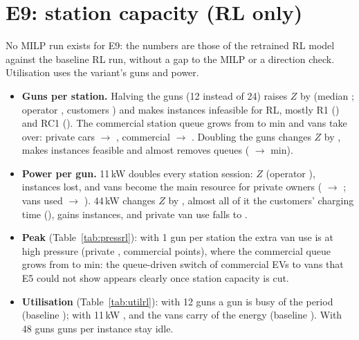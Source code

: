 \section{E9: station capacity (RL only)}\label{sec:e9}
No MILP run exists for E9: the numbers are those of the retrained RL model against the baseline RL run, without a gap to the MILP or a direction check. Utilisation uses the variant's guns and power.


\begin{itemize}
  \item \textbf{Guns per station.} Halving the guns (12 instead of 24) raises $Z$ by \dZEnineGunsLoRt\pct{} (median \dZmedEnineGunsLoRt\pct; operator \dOpEnineGunsLoRt\pct, customers \dCuEnineGunsLoRt\pct) and makes \LostEnineGunsLoRt{} instances infeasible for RL, mostly R1 (\LostFamEnineGunsLoRone) and RC1 (\LostFamEnineGunsLoRCone). The commercial station queue grows from \QComBEnineGunsLoRt{} to \QComEnineGunsLoRt{} min and vans take over: private cars \VanPBEnineGunsLoRt\pct{} $\to$ \VanPEnineGunsLoRt\pct, commercial \VanCBEnineGunsLoRt\pct{} $\to$ \VanCEnineGunsLoRt\pct. Doubling the guns changes $Z$ by \dZEnineGunsHiRt\pct, makes \NewEnineGunsHiRt{} instances feasible and almost removes queues (\QComBEnineGunsHiRt{} $\to$ \QComEnineGunsHiRt{} min).
  \item \textbf{Power per gun.} 11\,kW doubles every station session: $Z$ \dZEninePowLoRt\pct{} (operator \dOpEninePowLoRt\pct), \LostEninePowLoRt{} instances lost, and vans become the main resource for private owners (\VanPBEninePowLoRt\pct{} $\to$ \VanPEninePowLoRt\pct; vans used \VansBEninePowLoRt{} $\to$ \VansEninePowLoRt). 44\,kW changes $Z$ by \dZEninePowHiRt\pct, almost all of it the customers' charging time (\dCuEninePowHiRt\pct), gains \NewEninePowHiRt{} instances, and private van use falls to \VanPEninePowHiRt\pct.
  \item \textbf{Peak} (Table~\ref{tab:pressrl}): with 1 gun per station the extra van use is at high pressure (private \PXEnineGunsLoVanPersonalHigh, commercial \PXEnineGunsLoVanCommercialHigh{} points), where the commercial queue grows from \PXEnineGunsLoQBHigh{} to \PXEnineGunsLoQHigh{} min: the queue-driven switch of commercial EVs to vans that E5 could not show appears clearly once station capacity is cut.
  \item \textbf{Utilisation} (Table~\ref{tab:utilrl}): with 12 guns a gun is busy \UXEnineGunsLoGunRt\pct{} of the period (baseline \UXBEnineGunsLoGunRt\pct); with 11\,kW \UXEninePowLoGunRt\pct, and the vans carry \UXEninePowLoVanEnergyRt\pct{} of the energy (baseline \UXBEninePowLoVanEnergyRt\pct). With 48 guns \UXEnineGunsHiIdleGunsRt{} guns per instance stay idle.
\end{itemize}

